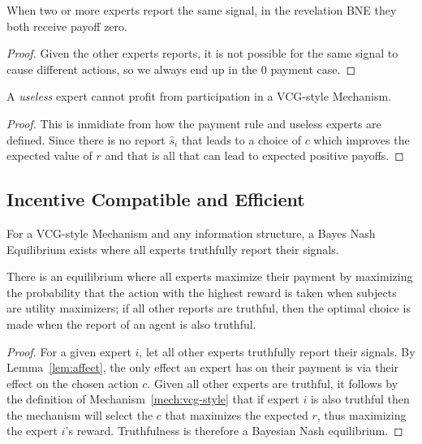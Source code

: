 \begin{lem}
	When two or more experts report the same signal, in the revelation BNE they both receive payoff zero. 
\end{lem}

\begin{proof}
	Given the other experts reports, it is not possible for the same signal to cause different actions, so we always end up in the 0 payment case.
\end{proof}


\begin{lem}
	A \emph{useless} expert cannot profit from participation in a VCG-style Mechanism.
\end{lem}

\begin{proof}
This is inmidiate from how the payment rule and useless experts are defined. Since there is no report $\hat{s}_i$ that leads to a choice of $c$ which improves the expected value of $r$ and that is all that can lead to expected positive payoffs.
\end{proof}


\subsection{Incentive Compatible and Efficient}

\begin{thm}
	For a VCG-style Mechanism and any information structure, a Bayes Nash Equilibrium exists where all experts truthfully report their signals.
\end{thm}

There is an equilibrium where all experts maximize their payment by maximizing the probability that the action with the highest reward is taken when subjects are utility maximizers; if all other reports are truthful, then the optimal choice is made when the report of an agent is also truthful.

\begin{proof}
For a given expert $i$, let all other experts truthfully report their signals. By Lemma~\ref{lem:affect}, the only effect an expert has on their payment is via their effect on the chosen action $c$. Given all other experts are truthful, it follows by the definition of Mechanism~\ref{mech:vcg-style} that if expert $i$ is also truthful then the mechanism will select the $c$ that maximizes the expected $r$, thus maximizing the expert $i$'s reward. Truthfulness is therefore a Bayesian Nash equilibrium.
\end{proof}


